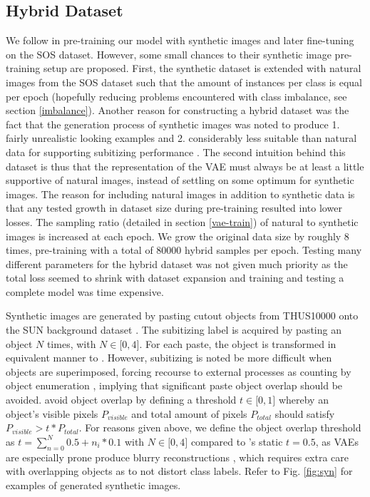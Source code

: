 \documentclass[twocolumn]{article}
\begin{document}
\hypertarget{hybrid}{%
\subsection{Hybrid Dataset}\label{hybrid}}

We follow \citet{zhang2016salient} in pre-training our model with
synthetic images and later fine-tuning on the SOS dataset. However, some
small chances to their synthetic image pre-training setup are proposed.
First, the synthetic dataset is extended with natural images from the
SOS dataset such that the amount of instances per class is equal per epoch (hopefully reducing problems encountered with class
imbalance, see section \ref{imbalance}). Another
reason for constructing a hybrid dataset was the fact that the
generation process of synthetic images was noted to produce 1. fairly
unrealistic looking examples and 2. considerably less suitable than
natural data for supporting subitizing performance
\citep{zhang2016salient}. The second intuition behind this dataset is
thus that the representation of the VAE must always be at least a little
supportive of natural images, instead of settling on some optimum for
synthetic images. The reason for including natural images in addition to synthetic data is that
any tested growth in dataset size during pre-training resulted into
lower losses. 
The sampling ratio (detailed in section \ref{vae-train}) of natural to synthetic images is increased at each epoch. We grow the
original data size by roughly 8 times, pre-training with a total of
80000 hybrid samples per epoch. Testing many different parameters for
the hybrid dataset was not given much priority as the total loss seemed
to shrink with dataset expansion and training and testing a complete model
was time expensive.

Synthetic images are generated by pasting cutout objects from THUS10000
\citep{cheng2015global} onto the SUN background dataset
\citep{xiao2010sun}. The subitizing label is acquired by pasting an
object \(N\) times, with \(N \in \lbrack0, 4\rbrack\). For each paste,
the object is transformed in equivalent manner to
\citet{zhang2016salient}. However, subitizing is noted be more difficult
when objects are superimposed, forcing recourse to external processes as
counting by object enumeration \citep[p.~57.]{dehaene2011number},
implying that significant paste object overlap should be avoided.
\citet{zhang2016salient} avoid object overlap by defining a threshold
\(t \in \lbrack0,1\rbrack\) whereby an object's visible pixels
\(P_{visible}\) and total amount of pixels \(P_{total}\) should satisfy
\(P_{visible} > t * P_{total}\). For reasons given above, we define the
object overlap threshold as \(t = \sum_{n=0}^{N} 0.5 + n_i * 0.1\) with
\(N \in \lbrack0,4\rbrack\) compared to \citet{zhang2016salient}'s
static \(t=0.5\), as VAEs are especially prone produce blurry
reconstructions \citep{hou2017deep, larsen2015autoencoding}, which
requires extra care with overlapping objects as to not distort class
labels. Refer to Fig. \ref{fig:syn} for examples of generated synthetic images.
\end{document}
